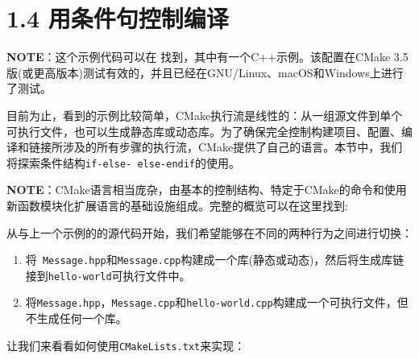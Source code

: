 \section{1.4 用条件句控制编译}

\begin{myInfoBox}
\textbf{NOTE}：这个示例代码可以在  找到，其中有一个C++示例。该配置在CMake 3.5版(或更高版本)测试有效的，并且已经在GNU/Linux、macOS和Windows上进行了测试。
\end{myInfoBox}

目前为止，看到的示例比较简单，CMake执行流是线性的：从一组源文件到单个可执行文件，也可以生成静态库或动态库。为了确保完全控制构建项目、配置、编译和链接所涉及的所有步骤的执行流，CMake提供了自己的语言。本节中，我们将探索条件结构\texttt{if-else- else-endif}的使用。

\begin{myInfoBox}
\textbf{NOTE}：CMake语言相当庞杂，由基本的控制结构、特定于CMake的命令和使用新函数模块化扩展语言的基础设施组成。完整的概览可以在这里找到: 
\end{myInfoBox}


从与上一个示例的的源代码开始，我们希望能够在不同的两种行为之间进行切换：

\begin{enumerate}
\item 将\texttt{ Message.hpp}和\texttt{Message.cpp}构建成一个库(静态或动态)，然后将生成库链接到\texttt{hello-world}可执行文件中。

\item 将\texttt{Message.hpp}，\texttt{Message.cpp}和\texttt{hello-world.cpp}构建成一个可执行文件，但不生成任何一个库。

\end{enumerate}

让我们来看看如何使用\texttt{CMakeLists.txt}来实现：


